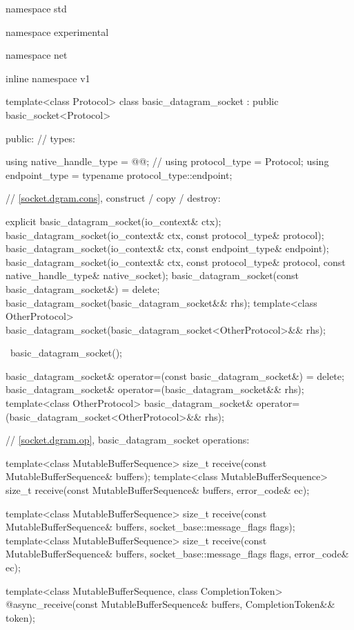 \begin{codeblock}
namespace std {
namespace experimental {
namespace net {
inline namespace v1 {

  template<class Protocol>
  class basic_datagram_socket : public basic_socket<Protocol>
  {
  public:
    // types:

    using native_handle_type = @@; // \nativeref
    using protocol_type = Protocol;
    using endpoint_type = typename protocol_type::endpoint;

    // \ref{socket.dgram.cons}, construct / copy / destroy:

    explicit basic_datagram_socket(io_context& ctx);
    basic_datagram_socket(io_context& ctx, const protocol_type& protocol);
    basic_datagram_socket(io_context& ctx, const endpoint_type& endpoint);
    basic_datagram_socket(io_context& ctx, const protocol_type& protocol,
                          const native_handle_type& native_socket);
    basic_datagram_socket(const basic_datagram_socket&) = delete;
    basic_datagram_socket(basic_datagram_socket&& rhs);
    template<class OtherProtocol>
      basic_datagram_socket(basic_datagram_socket<OtherProtocol>&& rhs);

    ~basic_datagram_socket();

    basic_datagram_socket& operator=(const basic_datagram_socket&) = delete;
    basic_datagram_socket& operator=(basic_datagram_socket&& rhs);
    template<class OtherProtocol>
      basic_datagram_socket& operator=(basic_datagram_socket<OtherProtocol>&& rhs);

    // \ref{socket.dgram.op}, basic_datagram_socket operations:

    template<class MutableBufferSequence>
      size_t receive(const MutableBufferSequence& buffers);
    template<class MutableBufferSequence>
      size_t receive(const MutableBufferSequence& buffers,
                     error_code& ec);

    template<class MutableBufferSequence>
      size_t receive(const MutableBufferSequence& buffers,
                     socket_base::message_flags flags);
    template<class MutableBufferSequence>
      size_t receive(const MutableBufferSequence& buffers,
                     socket_base::message_flags flags, error_code& ec);

    template<class MutableBufferSequence, class CompletionToken>
      @\DEDUCED@ async_receive(const MutableBufferSequence& buffers,
                            CompletionToken&& token);

}}}}}
\end{codeblock}
